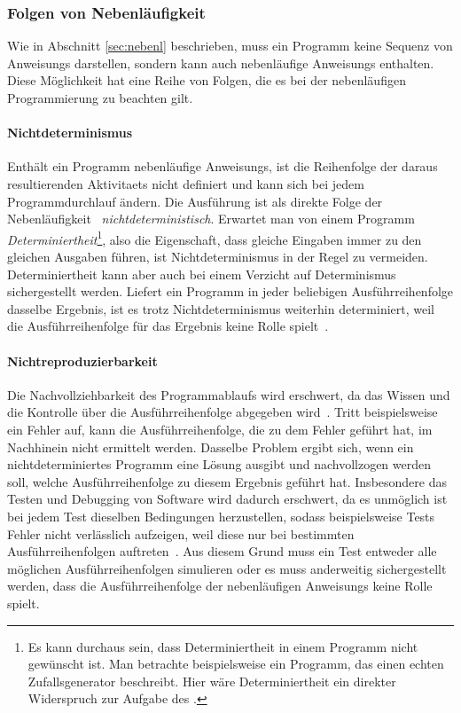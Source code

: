 \subsubsection{Folgen von Nebenläufigkeit}\label{sec:nebenl-folgen}
Wie in Abschnitt \ref{sec:nebenl} beschrieben, muss ein \gls{Programm} keine Sequenz von \glspl{Anweisung} darstellen, sondern kann auch nebenläufige \glspl{Anweisung} enthalten. Diese Möglichkeit hat eine Reihe von Folgen, die es bei der nebenläufigen Programmierung zu beachten gilt.
\paragraph{Nichtdeterminismus}
Enthält ein \gls{Programm} nebenläufige \glspl{Anweisung}, ist die Reihenfolge der daraus resultierenden \glspl{Aktivitaet} nicht definiert und kann sich bei jedem Programmdurchlauf ändern. Die Ausführung ist als direkte Folge der Nebenläufigkeit~\cite[S.~17~\psq]{Herrtwich1989} \emph{nichtdeterministisch}. Erwartet man von einem \gls{Programm} \emph{Determiniertheit}\footnote{Es kann durchaus sein, dass Determiniertheit in einem \gls{Programm} nicht gewünscht ist. Man betrachte beispielsweise ein \gls{Programm}, das einen echten Zufallsgenerator beschreibt. Hier wäre Determiniertheit ein direkter Widerspruch zur Aufgabe des .}, also die Eigenschaft, dass gleiche Eingaben immer zu den gleichen Ausgaben führen, ist Nichtdeterminismus in der Regel zu vermeiden. Determiniertheit kann aber auch bei einem Verzicht auf Determinismus sichergestellt werden. Liefert ein \gls{Programm} in jeder beliebigen Ausführreihenfolge dasselbe Ergebnis, ist es trotz Nichtdeterminismus weiterhin determiniert, weil die Ausführreihenfolge für das Ergebnis keine Rolle spielt~\cite[S.~18~\psq]{Herrtwich1989}. 
\paragraph{Nichtreproduzierbarkeit}
Die Nachvollziehbarkeit des Programmablaufs wird erschwert, da das Wissen und die Kontrolle über die Ausführreihenfolge abgegeben wird~\cite[S.~20]{Herrtwich1989}. Tritt beispielsweise ein Fehler auf, kann die Ausführreihenfolge, die zu dem Fehler geführt hat, im Nachhinein nicht ermittelt werden. Dasselbe Problem ergibt sich, wenn ein nichtdeterminiertes \gls{Programm} eine Lösung ausgibt und nachvollzogen werden soll, welche Ausführreihenfolge zu diesem Ergebnis geführt hat. Insbesondere das Testen und Debugging von Software wird dadurch erschwert, da es unmöglich ist bei jedem Test dieselben Bedingungen herzustellen, sodass beispielsweise Tests Fehler nicht verlässlich aufzeigen, weil diese nur bei bestimmten Ausführreihenfolgen auftreten~\cite[S.~20]{Herrtwich1989}. Aus diesem Grund muss ein Test entweder alle möglichen Ausführreihenfolgen simulieren oder es muss anderweitig sichergestellt werden, dass die Ausführreihenfolge der nebenläufigen \glspl{Anweisung} keine Rolle spielt.
